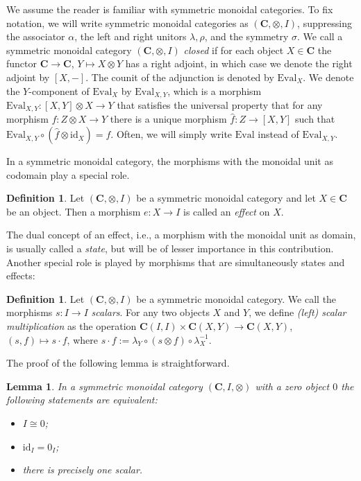 \documentclass[12pt]{tac}
\newtheorem{lemma}[theorem]{Lemma}
\theoremstyle{definition}
\newtheorem{definition}[theorem]{Definition}
\theoremstyle{remark}
\newcommand{\<}{\langle}
\renewcommand{\>}{\rangle}
\renewcommand{\:}{\colon}
\newcommand{\Eval}{\mathrm{Eval}}
\newcommand{\id}{\mathrm{id}}
\begin{document}
We assume the reader is familiar with symmetric monoidal categories. To fix notation, we will write symmetric monoidal categories as $(\mathbf{C}, \otimes, I)$, 
suppressing the associator $\alpha$, the left and right unitors $\lambda, \rho$, 
and the symmetry $\sigma$. We call a symmetric monoidal category $(\mathbf C,\otimes, I)$
\emph{closed} if for each object $X\in\mathbf C$ the functor $\mathbf C\to\mathbf C$, $Y\mapsto X\otimes Y$ has a right adjoint, in which case we denote the right adjoint by $[X,-]$. The counit of the adjunction is denoted by $\Eval_X$. We denote the $Y$-component of $\Eval_X$ by $\Eval_{X,Y}$, which is a morphism $\Eval_{X,Y}:[X, Y]\otimes X\to Y$ that satisfies the universal property that for any morphism $f:Z\otimes X\to Y$ there is a unique morphism $\hat f:Z\to[X,Y]$ such that $\Eval_{X,Y}\circ (\hat f\otimes\id_{X})=f$. Often, we will simply write $\Eval$ instead of $\Eval_{X,Y}$.


In a symmetric monoidal category, the morphisms with the monoidal unit as codomain play a special role.

\begin{definition}
    Let $(\mathbf C,\otimes,I)$ be a symmetric monoidal category and let $X\in\mathbf C$ be an object. Then a morphism $e:X\to I$ is called an \emph{effect} on $X$. 
\end{definition}


The dual concept of an effect, i.e., a morphism with the monoidal unit as domain, is usually called a \emph{state}, but will be of lesser importance in this contribution. Another special role is played by morphisms that are simultaneously states and effects:

\begin{definition}
    Let $(\mathbf C,\otimes, I)$ be a symmetric monoidal category. We call the morphisms $s:I\to I$ \emph{scalars}. For any two objects $X$ and $Y$, we define \emph{(left) scalar multiplication} as the operation $\mathbf C(I,I)\times\mathbf C(X,Y)\to\mathbf C(X,Y)$, $(s,f)\mapsto s\cdot f$,  where $s\cdot f:=\lambda_Y\circ (s\otimes f)\circ \lambda_X^{-1}$.
\end{definition}

The proof of the following lemma is straightforward. 
\begin{lemma}\label{lem:IisZero}
    In a symmetric monoidal category $(\mathbf C,I,\otimes)$ with a zero object $0$ the following statements are equivalent:
    \begin{itemize}
        \item[(1)] $I\cong 0$;
        \item[(2)] $\id_I=0_I$;
        \item[(3)] there is precisely one scalar.
    \end{itemize}
\end{lemma}
\end{document}

